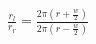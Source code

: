 \documentclass[preview]{standalone}
\begin{document}
\begin{center}
$\frac{r_{l} } { {r_{r} } } = \frac{2\pi(r+\frac{w}{2})}{2\pi(r-\frac{w}{2})}$
\end{center}
\end{document}
